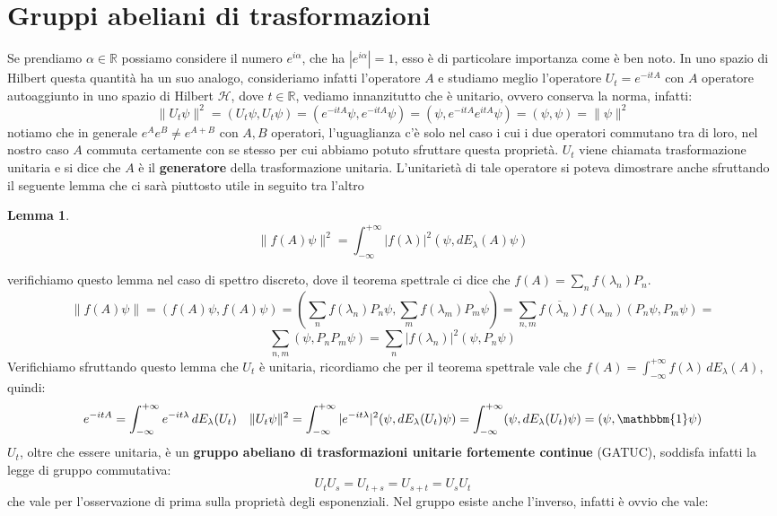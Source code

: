 \documentclass[12pt]{book}
\theoremstyle{plain}
\newcommand{\R}{\mathbb{R}}
\renewcommand{\H}{\mathcal{H}}
\newtheorem{lem}[thm]{Lemma}
\theoremstyle{definition}
\theoremstyle{remark}
\begin{document}
\section{Gruppi abeliani di trasformazioni}
Se prendiamo $\alpha\in\R$ possiamo considere il numero $e^{i\alpha}$, che ha $|e^{i\alpha}|=1$, esso è di particolare importanza come è ben noto. In uno spazio di Hilbert questa quantità ha un suo analogo, consideriamo infatti l'operatore $A$ e studiamo meglio l'operatore $U_t = e^{-itA}$ con $A$ operatore autoaggiunto in uno spazio di Hilbert $\H$, dove $t\in\R$, vediamo innanzitutto che è unitario, ovvero conserva la norma, infatti:
\[\|U_t\psi\|^2 = (U_t\psi,U_t\psi) = (e^{-itA}\psi,e^{-itA}\psi) = (\psi, e^{-itA}e^{itA}\psi) = (\psi,\psi) = \|\psi\|^2\]
notiamo che in generale $e^Ae^B\neq e^{A+B}$ con $A,B$ operatori, l'uguaglianza c'è solo nel caso i cui i due operatori commutano tra di loro, nel nostro caso $A$ commuta certamente con se stesso per cui abbiamo potuto sfruttare questa proprietà. $U_t$ viene chiamata trasformazione unitaria e si dice che $A$ è il \textbf{generatore} della trasformazione unitaria. L'unitarietà di tale operatore si poteva dimostrare anche sfruttando il seguente lemma che ci sarà piuttosto utile in seguito tra l'altro
\begin{lem}
\label{lemmautilesullenorme}
\[\|f(A)\psi\|^2 = \int_{-\infty}^{+\infty}|f(\lambda)|^2(\psi,dE_\lambda(A)\psi)\]
\end{lem}
verifichiamo questo lemma nel caso di spettro discreto, dove il teorema spettrale ci dice che $f(A) = \sum_n f(\lambda_n) P_n $.
\[\|f(A)\psi\| = (f(A)\psi,f(A)\psi) = \left(\sum_n f(\lambda_n) P_n\psi,\sum_m f(\lambda_m) P_m\psi\right) = \sum_{n,m}\overline{f(\lambda_n)}f(\lambda_m)(P_n\psi,P_m\psi) = \]
\[\sum_{n,m}(\psi,P_nP_m\psi) = \sum_n |f(\lambda_n)|^2(\psi,P_n\psi)\]
Verifichiamo sfruttando questo lemma che $U_t$ è unitaria, ricordiamo che per il teorema spettrale vale che $f(A) = \int_{-\infty}^{+\infty}f(\lambda)\,dE_\lambda(A)$, quindi:
\[e^{-itA} = \int_{-\infty}^{+\infty}e^{-it\lambda}\,dE_\lambda(U_t) \quad \|U_t\psi\|^2 = \int_{-\infty}^{+\infty}|e^{-it\lambda}|^2(\psi,dE_\lambda(U_t)\psi) =  \int_{-\infty}^{+\infty}(\psi,dE_\lambda(U_t)\psi) = (\psi,\mathbbm{1}\psi)\]
$U_t$, oltre che essere unitaria, è un \textbf{gruppo abeliano di trasformazioni unitarie fortemente continue} (GATUC), soddisfa infatti la legge di gruppo commutativa:
\[U_tU_s = U_{t+s} = U_{s+t} = U_sU_t\]
che vale per l'osservazione di prima sulla proprietà degli esponenziali. Nel gruppo esiste anche l'inverso, infatti è ovvio che vale:
\end{document}
